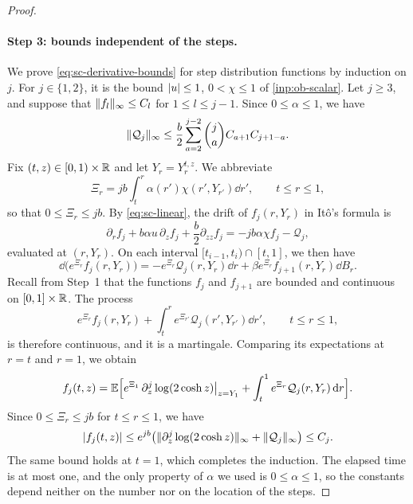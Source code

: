 \begin{proof}
\paragraph{Step 3: bounds independent of the steps.}
We prove \eqref{eq:sc-derivative-bounds} for step distribution functions by
induction on $j$. For $j\in\{1,2\}$, it is the bound $\lvert u\rvert\le1$,
$0<\chi\le1$ of \cref{inp:ob-scalar}. Let $j\ge3$, and suppose that
$\lVert f_l\rVert_\infty\le C_l$ for $1\le l\le j-1$. Since $0\le\alpha\le1$, we
have
\[
 \lVert \mathcal Q_j\rVert_\infty\le\frac b2\sum_{a=2}^{j-2}\binom ja C_{a+1}C_{j+1-a}.
\]
Fix $(t,z)\in[0,1)\times\mathbb R$ and let $Y_r=Y^{t,z}_r$. We abbreviate
\[
 \Xi_r=jb\int_t^r\alpha(r')\chi(r',Y_{r'})\dd r',\qquad t\le r\le1,
\]
so that $0\le\Xi_r\le jb$. By \eqref{eq:sc-linear}, the drift of
$f_j(r,Y_r)$ in It\^o's formula is
\[
 \partial_rf_j+b\alpha u\,\partial_zf_j+\frac b2\partial_{zz}f_j
 =-jb\alpha\chi f_j-\mathcal Q_j,
\]
evaluated at $(r,Y_r)$. On each interval $[t_{i-1},t_i)\cap[t,1]$, we then
have
\[
 \dd\bigl(e^{\Xi_r}f_j(r,Y_r)\bigr)
 =-e^{\Xi_r}\mathcal Q_j(r,Y_r)\dd r
   +\beta e^{\Xi_r}f_{j+1}(r,Y_r)\dd B_r.
\]
Recall from Step~1 that the functions $f_j$ and $f_{j+1}$ are bounded and
continuous on $[0,1]\times\mathbb R$. The process
\[
 e^{\Xi_r}f_j(r,Y_r)
   +\int_t^re^{\Xi_{r'}}\mathcal Q_j(r',Y_{r'})\dd r',\qquad t\le r\le1,
\]
is therefore continuous, and it is a martingale. Comparing its expectations
at $r=t$ and $r=1$, we obtain
\[
 f_j(t,z)=\mathbb E\Bigl[e^{\Xi_1}\,\partial_z^j\log(2\cosh z)\big|_{z=Y_1}
   +\int_t^1e^{\Xi_r}\mathcal Q_j(r,Y_r)\,\mathrm d r\Bigr].
\]
Since $0\le\Xi_r\le jb$ for $t\le r\le1$, we have
\[
 \lvert f_j(t,z)\rvert\le e^{jb}\bigl(\lVert \partial_z^j\log(2\cosh z)\rVert_\infty
   +\lVert \mathcal Q_j\rVert_\infty\bigr)\le C_j.
\]
The same bound holds at $t=1$, which completes the induction. The
elapsed time is at most one, and the only property of $\alpha$ we used is
$0\le\alpha\le1$, so the constants depend neither on the number
nor on the location of the steps.


\end{proof}
